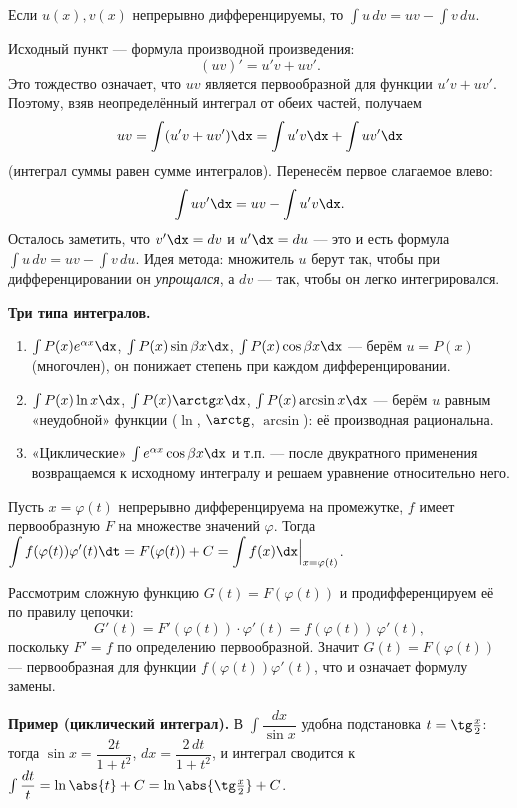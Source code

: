 \stmt Если $u(x),v(x)$ непрерывно дифференцируемы, то
$\displaystyle\int u\,dv=uv-\int v\,du$.

\dok Исходный пункт — формула производной произведения:
\[
  (uv)'=u'v+uv'.
\]
Это тождество означает, что $uv$ является первообразной для функции $u'v+uv'$. Поэтому, взяв
неопределённый интеграл от обеих частей, получаем
\[
  uv=\int (u'v+uv')\dx=\int u'v\dx+\int uv'\dx
\]
(интеграл суммы равен сумме интегралов). Перенесём первое слагаемое влево:
\[
  \int uv'\dx=uv-\int u'v\dx .
\]
Осталось заметить, что $v'\dx=dv$ и $u'\dx=du$ — это и есть формула $\int u\,dv=uv-\int v\,du$.
Идея метода: множитель $u$ берут так, чтобы при дифференцировании он \emph{упрощался}, а $dv$ —
так, чтобы он легко интегрировался.

\smallskip
\noindent\textbf{Три типа интегралов.}
\begin{enumerate}[label=\arabic*),leftmargin=*,nosep]
  \item $\int P(x)e^{\alpha x}\dx$, $\int P(x)\sin\beta x\dx$, $\int P(x)\cos\beta x\dx$ — берём
        $u=P(x)$ (многочлен), он понижает степень при каждом дифференцировании.
  \item $\int P(x)\ln x\dx$, $\int P(x)\arctg x\dx$, $\int P(x)\arcsin x\dx$ — берём $u$ равным
        «неудобной» функции ($\ln$, $\arctg$, $\arcsin$): её производная рациональна.
  \item «Циклические» $\int e^{\alpha x}\cos\beta x\dx$ и т.п. — после двукратного применения
        возвращаемся к исходному интегралу и решаем уравнение относительно него.
\end{enumerate}

\stmt Пусть $x=\varphi(t)$ непрерывно дифференцируема на промежутке, $f$ имеет первообразную $F$
на множестве значений $\varphi$. Тогда
$\displaystyle\int f(\varphi(t))\varphi'(t)\dt=F(\varphi(t))+C=\int f(x)\dx\Big|_{x=\varphi(t)}$.

\dok Рассмотрим сложную функцию $G(t)=F(\varphi(t))$ и продифференцируем её по правилу цепочки:
\[
  G'(t)=F'(\varphi(t))\cdot\varphi'(t)=f(\varphi(t))\,\varphi'(t),
\]
поскольку $F'=f$ по определению первообразной. Значит $G(t)=F(\varphi(t))$ — первообразная для
функции $f(\varphi(t))\varphi'(t)$, что и означает формулу замены.

\smallskip
\noindent\textbf{Пример (циклический интеграл).} В $\int\dfrac{dx}{\sin x}$ удобна подстановка
$t=\tg\tfrac x2$: тогда $\sin x=\dfrac{2t}{1+t^2}$, $dx=\dfrac{2\,dt}{1+t^2}$, и интеграл
сводится к $\int\dfrac{dt}{t}=\ln\abs{t}+C=\ln\abs{\tg\tfrac x2}+C$.

